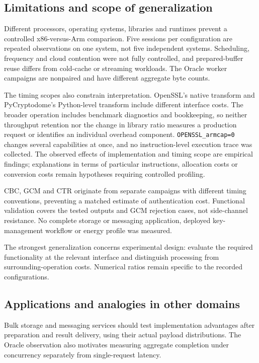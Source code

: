 \subsection{Limitations and scope of generalization}
Different processors, operating systems, libraries and runtimes prevent a controlled x86-versus-Arm comparison. Five sessions per configuration are repeated observations on one system, not five independent systems. Scheduling, frequency and cloud contention were not fully controlled, and prepared-buffer reuse differs from cold-cache or streaming workloads. The Oracle worker campaigns are nonpaired and have different aggregate byte counts.

The timing scopes also constrain interpretation. OpenSSL's native transform and PyCryptodome's Python-level transform include different interface costs. The broader operation includes benchmark diagnostics and bookkeeping, so neither throughput retention nor the change in library ratio measures a production request or identifies an individual overhead component. \texttt{OPENSSL\_armcap=0} changes several capabilities at once, and no instruction-level execution trace was collected. The observed effects of implementation and timing scope are empirical findings; explanations in terms of particular instructions, allocation costs or conversion costs remain hypotheses requiring controlled profiling.

CBC, GCM and CTR originate from separate campaigns with different timing conventions, preventing a matched estimate of authentication cost. Functional validation covers the tested outputs and GCM rejection cases, not side-channel resistance. No complete storage or messaging application, deployed key-management workflow or energy profile was measured.

The strongest generalization concerns experimental design: evaluate the required functionality at the relevant interface and distinguish processing from surrounding-operation costs. Numerical ratios remain specific to the recorded configurations.

\subsection{Applications and analogies in other domains}
Bulk storage and messaging services should test implementation advantages after preparation and result delivery, using their actual payload distributions. The Oracle observation also motivates measuring aggregate completion under concurrency separately from single-request latency.

